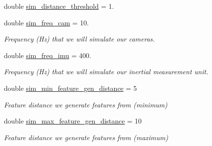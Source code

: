 \begin{DoxyCompactItemize}
double \hyperlink{structov__init_1_1InertialInitializerOptions_aa21a87a289051ef5ae66b315a53de75e}{sim\+\_\+distance\+\_\+threshold} = 1.
\item 
\mbox{\label{structov__init_1_1InertialInitializerOptions_aad85b7e3154b976099a927066259e19b}} 
double \hyperlink{structov__init_1_1InertialInitializerOptions_aad85b7e3154b976099a927066259e19b}{sim\+\_\+freq\+\_\+cam} = 10.
\begin{DoxyCompactList}\small\item\em Frequency (Hz) that we will simulate our cameras. \end{DoxyCompactList}\item 
\mbox{\label{structov__init_1_1InertialInitializerOptions_ad5469977d726e6281781746dbf527c1e}} 
double \hyperlink{structov__init_1_1InertialInitializerOptions_ad5469977d726e6281781746dbf527c1e}{sim\+\_\+freq\+\_\+imu} = 400.
\begin{DoxyCompactList}\small\item\em Frequency (Hz) that we will simulate our inertial measurement unit. \end{DoxyCompactList}\item 
\mbox{\label{structov__init_1_1InertialInitializerOptions_a5dcebf9e0a5f13dde042ba43db83cf37}} 
double \hyperlink{structov__init_1_1InertialInitializerOptions_a5dcebf9e0a5f13dde042ba43db83cf37}{sim\+\_\+min\+\_\+feature\+\_\+gen\+\_\+distance} = 5
\begin{DoxyCompactList}\small\item\em Feature distance we generate features from (minimum) \end{DoxyCompactList}\item 
\mbox{\label{structov__init_1_1InertialInitializerOptions_a0408c41382b9a69d976e27e977884765}} 
double \hyperlink{structov__init_1_1InertialInitializerOptions_a0408c41382b9a69d976e27e977884765}{sim\+\_\+max\+\_\+feature\+\_\+gen\+\_\+distance} = 10
\begin{DoxyCompactList}\small\item\em Feature distance we generate features from (maximum) \end{DoxyCompactList}\end{DoxyCompactItemize}



